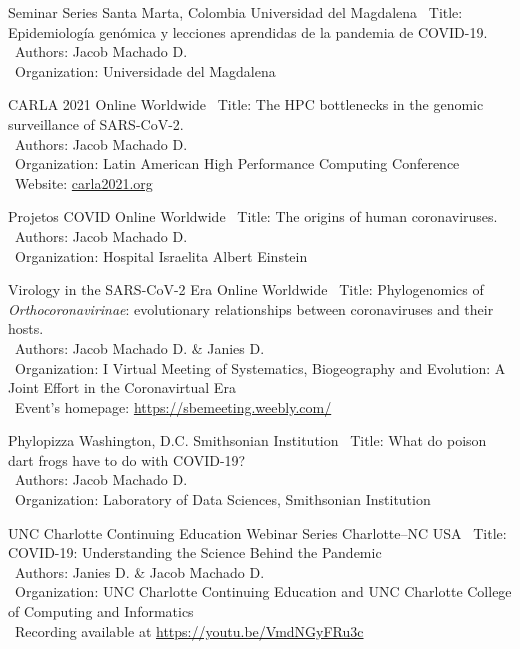 \documentclass[11pt, letterpaper, sans]{moderncv}
\begin{document}
\cventry{---}
	{Seminar Series}
	{Santa Marta, Colombia}
	{Universidad del Magdalena}
	{}
	{
		\textbullet~Title: Epidemiología genómica y lecciones aprendidas de la pandemia de COVID-19.\\
		\textbullet~Authors: Jacob Machado D.\\
		\textbullet~Organization: Universidade del Magdalena\\
	}

\cventry{---}
	{CARLA 2021}
	{Online}
	{Worldwide}
	{}
	{
		\textbullet~Title: The HPC bottlenecks in the genomic surveillance of SARS-CoV-2.\\
		\textbullet~Authors: Jacob Machado D.\\
		\textbullet~Organization: Latin American High Performance Computing Conference\\
		\textbullet~Website: \url{carla2021.org}\\
	}

\cventry{---}
	{Projetos COVID}
	{Online}
	{Worldwide}
	{}
	{
		\textbullet~Title: The origins of human coronaviruses.\\
		\textbullet~Authors: Jacob Machado D.\\
		\textbullet~Organization: Hospital Israelita Albert Einstein\\
	}

	{Virology in the SARS-CoV-2 Era}
	{Online}
	{Worldwide}
	{}
	{
		\textbullet~Title: Phylogenomics of \textit{Orthocoronavirinae}: evolutionary relationships between coronaviruses and their hosts.\\
		\textbullet~Authors: Jacob Machado D. \& Janies D.\\
		\textbullet~Organization: I Virtual Meeting of Systematics, Biogeography and Evolution: A Joint Effort in the Coronavirtual Era\\
		\textbullet~Event's homepage: \url{https://sbemeeting.weebly.com/}
	}

\cventry{---}
	{Phylopizza}
	{Washington, D.C.}
	{Smithsonian Institution}
	{}
	{
		\textbullet~Title: What do poison dart frogs have to do with COVID-19?\\
		\textbullet~Authors: Jacob Machado D.\\
		\textbullet~Organization: Laboratory of Data Sciences, Smithsonian Institution\\
	}

\cventry{---}
	{UNC Charlotte Continuing Education Webinar Series}
	{Charlotte--NC}
	{USA}
	{}
	{
		\textbullet~Title: COVID-19: Understanding the Science Behind the Pandemic\\
		\textbullet~Authors: Janies D. \& Jacob Machado D.\\
		\textbullet~Organization: UNC Charlotte Continuing Education and UNC Charlotte College of Computing and Informatics\\
		\textbullet~Recording available at \url{https://youtu.be/VmdNGyFRu3c}
	}
\end{document}
